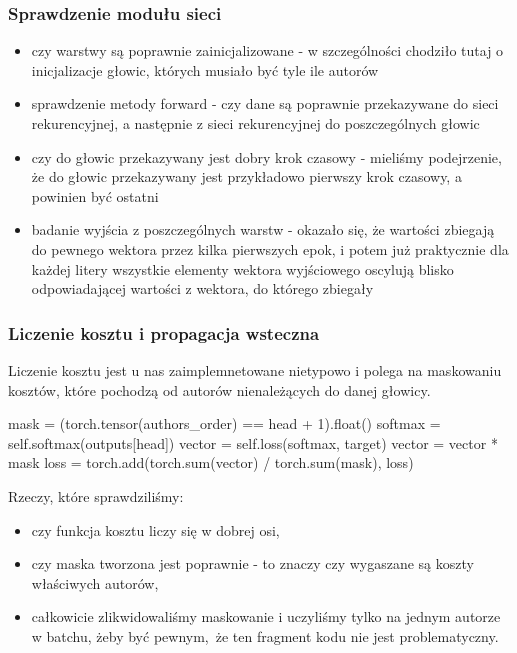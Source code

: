 \subsubsection{Sprawdzenie modułu sieci}

	\begin{itemize} 
	  \item {czy warstwy są poprawnie zainicjalizowane - w szczególności chodziło tutaj o inicjalizacje głowic, 
	  których musiało być tyle ile autorów}
	  \item {sprawdzenie metody forward - czy dane są poprawnie przekazywane do sieci rekurencyjnej, a następnie 
	  z sieci rekurencyjnej do poszczególnych głowic}
	  \item {czy do głowic przekazywany jest dobry krok czasowy - mieliśmy podejrzenie, że do głowic przekazywany jest przykładowo
	  pierwszy krok czasowy, a powinien być ostatni}
	  \item {badanie wyjścia z poszczególnych warstw - okazało się, że wartości zbiegają do pewnego wektora przez kilka pierwszych epok,
	  i potem już praktycznie dla każdej litery wszystkie elementy wektora wyjściowego oscylują blisko odpowiadającej wartości z  wektora,
	  do którego zbiegały}
	\end{itemize}
	
\newpage
\subsubsection{Liczenie kosztu i propagacja wsteczna}
Liczenie kosztu jest u nas zaimplemnetowane nietypowo i polega na maskowaniu kosztów, które pochodzą od autorów
nienależących do danej głowicy. 
\begin{python}
mask = (torch.tensor(authors_order) == head + 1).float()
softmax = self.softmax(outputs[head])
vector = self.loss(softmax, target)
vector = vector * mask
loss = torch.add(torch.sum(vector) / torch.sum(mask), loss)
    
\end{python} 
Rzeczy, które sprawdziliśmy: 
\begin{itemize}
	  \item {czy funkcja kosztu liczy się w dobrej osi,}
	  \item {czy maska tworzona jest poprawnie - to znaczy czy wygaszane są koszty właściwych autorów,}
	  \item {całkowicie zlikwidowaliśmy maskowanie i uczyliśmy tylko na jednym autorze w batchu, żeby być pewnym, że ten fragment
	  kodu nie jest problematyczny.}
\end{itemize}

